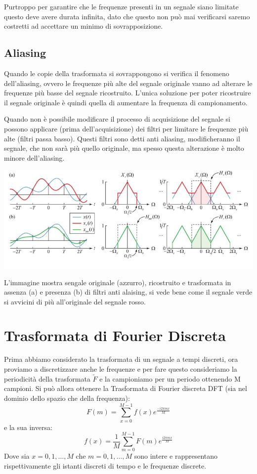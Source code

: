 Purtroppo per garantire che le frequenze presenti in un segnale siano limitate questo deve avere durata infinita, dato che questo non può mai verificarsi saremo costretti ad accettare un minimo di sovrapposizione.

\subsection{Aliasing}
Quando le copie della trasformata si sovrappongono si verifica il fenomeno dell'aliasing, ovvero le frequenze più alte del segnale originale vanno ad alterare le frequenze più basse del segnale ricostruito. L'unica soluzione per poter ricostruire il segnale originale è quindi quella di aumentare la frequenza di campionamento.

Quando non è possibile modificare il processo di acquisizione del segnale si possono applicare (prima dell'acquisizione) dei filtri per limitare le frequenze più alte (filtri passa basso).  Questi filtri sono detti anti aliasing, modificheranno il segnale, che non sarà più quello originale, ma spesso questa alterazione è molto minore dell'aliasing. 
\begin{center}
	\includegraphics[width=.9\linewidth]{Picture/Aliasing}
\end{center} 
\vspace{-.3cm}
 L'immagine mostra sengale originale (azzurro), ricostruito e trasformata in assenza (a) e presenza (b) di filtri anti alaising, si vede bene come il segnale verde  si avvicini di più all'originale del segnale rosso.
 
 \section{Trasformata di Fourier Discreta}
 Prima abbiamo considerato la trasformata di un segnale a tempi discreti, ora proviamo a discretizzare anche le frequenze e per fare questo consideriamo la periodicità della trasformata $\tilde{F}$ e la campioniamo per un periodo ottenendo M campioni. Si può allora ottenere la Trasformata di Fourier discreta DFT (sia nel dominio dello spazio che della frequenza):
 \begin{equation}
 	F(m) = \sum_{x = 0}^{M-1} f(x)e^{\frac{-i2\pi m x}{M}}
 \end{equation}
 e la sua inversa:
  \begin{equation}
 	f(x) =\frac{1}{M} \sum_{m = 0}^{M-1} F(m)e^{\frac{i2\pi m x}{M}}
 \end{equation}
 Dove sia $x = 0,  1,\dots, M$ che $m = 0,  1,\dots, M$ sono intere e rappresentano rispettivamente gli istanti discreti di tempo e le frequenze discrete.

